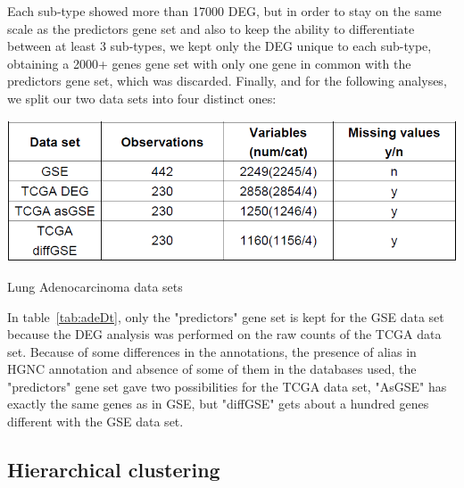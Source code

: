 \documentclass[twocolumn]{article}
\begin{document}
Each sub-type showed more than 17000 DEG, but in order to stay on the same scale as the predictors gene set and also to keep the ability to differentiate between at least 3 sub-types, we kept only the DEG unique to each sub-type, obtaining a 2000+ genes gene set with only one gene in common with the predictors gene set, which was discarded.
Finally, and for the following analyses, we split our two data sets into four distinct ones:
\begin{table}[!]
    \centering
    \includegraphics[scale=0.4]{img/adenodatasets.png}
    \caption{Lung Adenocarcinoma data sets}
    \label{tab:adeDt}
\end{table}
In table~\ref{tab:adeDt}, only the "predictors" gene set is kept for the GSE data set because the DEG analysis was performed on the raw counts of the TCGA data set.
Because of some differences in the annotations, the presence of alias in HGNC annotation and absence of some of them in the databases used, the "predictors" gene set gave two possibilities for the TCGA data set, "AsGSE" has exactly the same genes as in GSE, but "diffGSE" gets about a hundred genes different with the GSE data set.

\subsection{Hierarchical clustering}
\end{document}
